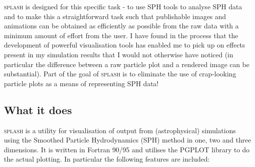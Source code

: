 \documentclass[a4paper,10pt]{article}
\newcommand{\splash}{\textsc{splash }}
\begin{document}
 \splash is designed for this specific task - to use SPH tools to analyse SPH data and to make this a
straightforward task such that publishable images and animations can be obtained
as efficiently as possible from the raw data with a minimum amount of effort
from the user. I have found in the process that the development of powerful
visualisation tools has enabled me to pick up on effects present in my
simulation results that I would not otherwise have noticed (in particular the
difference between a raw particle plot and a rendered image can be substantial). Part of the goal of
\splash is to eliminate the use of crap-looking particle plots as a means of representing SPH data!

\subsection{What it does}
\splash is a utility for visualisation of output from (astrophysical) simulations using the
Smoothed Particle Hydrodynamics (SPH) method in one, two and three dimensions.
It is written in Fortran 90/95 and utilises the PGPLOT library to do the actual plotting. In particular the following
features are included:
\end{document}
